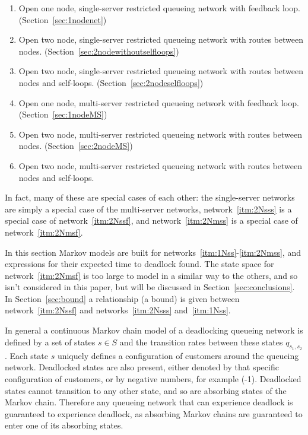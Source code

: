 \documentclass{article}
\numberwithin{equation}{section}
\begin{document}
\begin{enumerate}
  \item Open one node, single-server restricted queueing network with feedback loop. (Section~\ref{sec:1nodenet}) \label{itm:1Nss}
  \item Open two node, single-server restricted queueing network with routes between nodes. (Section~\ref{sec:2nodewithoutselfloops}) \label{itm:2Nsss}
  \item Open two node, single-server restricted queueing network with routes between nodes and self-loops. (Section~\ref{sec:2nodeselfloops}) \label{itm:2Nssf}
  \item Open one node, multi-server restricted queueing network with feedback loop. (Section~\ref{sec:1nodeMS}) \label{itm:1Nms}
  \item Open two node, multi-server restricted queueing network with routes between nodes. (Section~\ref{sec:2nodeMS}) \label{itm:2Nmss}
  \item Open two node, multi-server restricted queueing network with routes between nodes and self-loops. \label{itm:2Nmsf}
\end{enumerate}

In fact, many of these are special cases of each other: the single-server networks are simply a special case of the multi-server networks, network~\ref{itm:2Nsss} is a special case of network~\ref{itm:2Nssf}, and network~\ref{itm:2Nmss} is a special case of network~\ref{itm:2Nmsf}.

In this section Markov models are built for networks~\ref{itm:1Nss}-\ref{itm:2Nmss}, and expressions for their expected time to deadlock found.
The state space for network~\ref{itm:2Nmsf} is too large to model in a similar way to the others, and so isn't considered in this paper, but will be discussed in Section~\ref{sec:conclusions}.
In Section~\ref{sec:bound} a relationship (a bound) is given between network~\ref{itm:2Nssf} and networks~\ref{itm:2Nsss} and~\ref{itm:1Nss}.

In general a continuous Markov chain model of a deadlocking queueing network is defined by a set of states $s \in S$ and the transition rates between these states $q_{s_1,s_2}$.
Each state $s$ uniquely defines a configuration of customers around the queueing network.
Deadlocked states are also present, either denoted by that specific configuration of customers, or by negative numbers, for example (-1).
Deadlocked states cannot transition to any other state, and so are absorbing states of the Markov chain.
Therefore any queueing network that can experience deadlock is guaranteed to experience deadlock, as absorbing Markov chains are guaranteed to enter one of its absorbing states.
\end{document}
